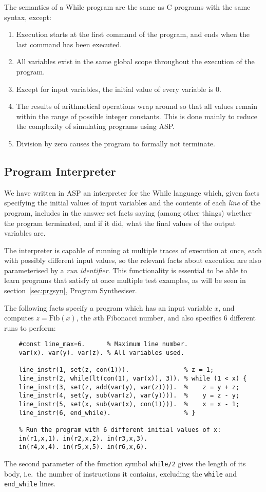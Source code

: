 \documentclass[a4paper,twoside,notitlepage]{article}
\newcommand{\ttt}{\texttt}
\begin{document}
The semantics of a While program are the same as C programs with the same 
syntax, except:
\begin{enumerate}
    \item Execution starts at the first command of the program, and ends when 
    the last command has been executed.
    \item All variables exist in the same global scope throughout the 
    execution of the program.
    \item Except for input variables, the initial value of every variable is 0.
    \item The results of arithmetical operations wrap around so that all 
    values remain within the range of possible integer constants. This is done 
    mainly to reduce the complexity of simulating programs using ASP.
    \item Division by zero causes the program to formally not terminate.
\end{enumerate}

\subsection{Program Interpreter}

We have written in ASP an interpreter for the While language which, given 
facts specifying the initial values of input variables and the contents of 
each \emph{line} of the program, includes in the answer set facts saying 
(among other things) whether the program terminated, and if it did, what the 
final values of the output variables are.

The interpreter is capable of running at multiple traces of execution at once, 
each with possibly different input values, so the relevant facts about 
execution are also parameterised by a \emph{run identifier}. This 
functionality is essential to be able to learn programs that satisfy at once 
multiple test examples, as will be seen in section~\ref{sec:prgsyn}, Program 
Synthesiser.

The following facts specify a program which has an input variable $x$, and 
computes $z = \textrm{Fib}(x)$, the $x$th Fibonacci number, and also specifies 
6 different runs to perform:
\begin{verbatim}
    #const line_max=6.      % Maximum line number.
    var(x). var(y). var(z). % All variables used.
    
    line_instr(1, set(z, con(1))).               % z = 1;
    line_instr(2, while(lt(con(1), var(x)), 3)). % while (1 < x) {
    line_instr(3, set(z, add(var(y), var(z)))).  %    z = y + z;
    line_instr(4, set(y, sub(var(z), var(y)))).  %    y = z - y;
    line_instr(5, set(x, sub(var(x), con(1)))).  %    x = x - 1;
    line_instr(6, end_while).                    % }
    
    % Run the program with 6 different initial values of x:
    in(r1,x,1). in(r2,x,2). in(r3,x,3).
    in(r4,x,4). in(r5,x,5). in(r6,x,6).
\end{verbatim}
The second parameter of the function symbol \texttt{while/2} gives the 
length of its body, i.e.\ the number of instructions it contains, 
excluding the \ttt{while} and \ttt{end\_while} lines.
\end{document}
